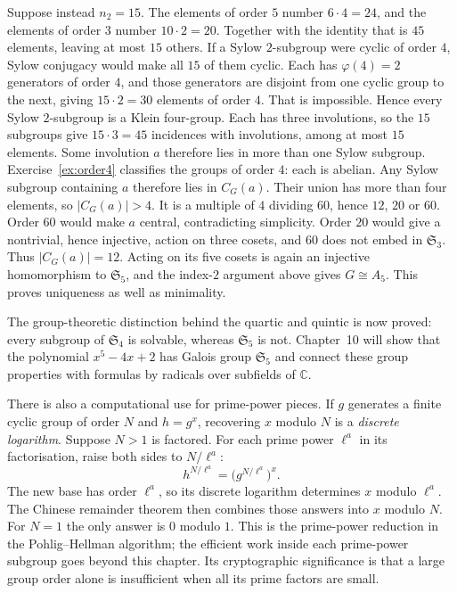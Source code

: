 Suppose instead $n_2=15$. The elements of order $5$ number $6\cdot4=24$, and the elements of order $3$ number $10\cdot2=20$.
Together with the identity that is $45$ elements, leaving at most $15$ others.
If a Sylow $2$-subgroup were cyclic of order $4$, Sylow conjugacy would make all $15$ of them cyclic.
Each has $\varphi(4)=2$ generators of order $4$, and those generators are disjoint from one cyclic group to the next, giving $15\cdot2=30$ elements of order $4$.
That is impossible. Hence every Sylow $2$-subgroup is a Klein four-group.
Each has three involutions, so the $15$ subgroups give $15\cdot3=45$ incidences with involutions, among at most $15$ elements.
Some involution $a$ therefore lies in more than one Sylow subgroup.
Exercise~\ref{ex:order4} classifies the groups of order $4$: each is abelian. Any Sylow subgroup containing $a$ therefore lies in $C_G(a)$.
Their union has more than four elements, so $|C_G(a)|>4$. It is a multiple of $4$ dividing $60$, hence $12$, $20$ or $60$.
Order $60$ would make $a$ central, contradicting simplicity.
Order $20$ would give a nontrivial, hence injective, action on three cosets, and $60$ does not embed in $\mathfrak S_3$.
Thus $|C_G(a)|=12$. Acting on its five cosets is again an injective homomorphism to $\mathfrak S_5$, and the index-$2$ argument above gives $G\cong A_5$.
This proves uniqueness as well as minimality.

\begin{beauty}
The group-theoretic distinction behind the quartic and quintic is now proved: every subgroup of $\mathfrak S_4$ is solvable, whereas $\mathfrak S_5$ is not. Chapter~10 will show that the polynomial $x^5-4x+2$ has Galois group $\mathfrak S_5$ and connect these group properties with formulas by radicals over subfields of $\mathbb C$.

There is also a computational use for prime-power pieces. If $g$ generates a finite cyclic group of order $N$ and $h=g^x$, recovering $x$ modulo $N$ is a \emph{discrete logarithm}. Suppose $N>1$ is factored. For each prime power $\ell^a$ in its factorisation, raise both sides to $N/\ell^a$:
\[
h^{N/\ell^a}=\bigl(g^{N/\ell^a}\bigr)^x.
\]
The new base has order $\ell^a$, so its discrete logarithm determines $x$ modulo $\ell^a$. The Chinese remainder theorem then combines those answers into $x$ modulo $N$. For $N=1$ the only answer is $0$ modulo $1$.
This is the prime-power reduction in the Pohlig--Hellman algorithm; the efficient work inside each prime-power subgroup goes beyond this chapter. Its cryptographic significance is that a large group order alone is insufficient when all its prime factors are small.
\end{beauty}


